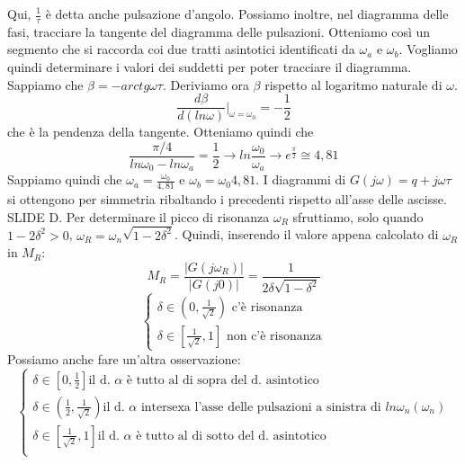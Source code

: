 \documentclass[11pt]{article}
\begin{document}
Qui, $\frac{1}{\tau}$ è detta anche pulsazione d'angolo. Possiamo inoltre, nel diagramma delle fasi, tracciare la tangente del diagramma delle pulsazioni. Otteniamo così un segmento che si raccorda coi due tratti asintotici identificati da $\omega_a$ e $\omega_b$. Vogliamo quindi determinare i valori dei suddetti per poter tracciare il diagramma.
Sappiamo che $\beta = -arctg \omega \tau$. Deriviamo ora $\beta$ rispetto al logaritmo naturale di $\omega$.
\begin{displaymath}
\frac{d\beta}{d(ln\omega)}|_{\omega=\omega_0} = -\frac{1}{2}
\end{displaymath} 
che è la pendenza della tangente. Otteniamo quindi che 
\begin{displaymath}
    \frac{\pi/4}{ln\omega_0-ln\omega_a}=\frac{1}{2} \rightarrow ln\frac{\omega_0}{\omega_a} \rightarrow e^{\frac{\pi}{2}} \cong 4,81
\end{displaymath}
Sappiamo quindi che $\omega_a = \frac{\omega_0}{4,81}$ e $\omega_b = \omega_0 4,81$. I diagrammi di $G(j\omega) = q+j\omega\tau$ si ottengono per simmetria ribaltando i precedenti rispetto all'asse delle ascisse. 
SLIDE D.
Per determinare il picco di risonanza $\omega_R$ sfruttiamo, solo quando $1-2\delta^2 >0$, $\omega_R = \omega_n\sqrt{1-2\delta^2}$. Quindi, inserendo il valore appena calcolato di $\omega_R$ in $M_R$:
\begin{displaymath}
    M_R = \frac{|G(j\omega_R)|}{|G(j0)|} = \frac{1}{2\delta\sqrt{1-\delta^2}}
\end{displaymath}
\begin{displaymath}
    \begin{cases}
        \delta \in \left(0,\frac{1}{\sqrt{2}}\right) \textrm{ c'è risonanza}\\
        \delta \in \left[\frac{1}{\sqrt{2}},1\right] \textrm{ non c'è risonanza}
    \end{cases}
\end{displaymath}
Possiamo anche fare un'altra osservazione:
\begin{displaymath}
    \begin{cases}
        \delta \in \left[0,\frac{1}{2}\right] \textrm{il d. }\alpha\textrm{ è tutto al di sopra del d. asintotico}\\
        \delta \in \left(\frac{1}{2},\frac{1}{\sqrt{2}}\right) \textrm{il d. }\alpha\textrm{ intersexa l'asse delle pulsazioni a sinistra di }ln\omega_n(\omega_n)\\
        \delta \in \left[\frac{1}{\sqrt{2}},1\right] \textrm{il d. }\alpha\textrm{ è tutto al di sotto del d. asintotico}\\
    \end{cases}
\end{displaymath}
\end{document}
